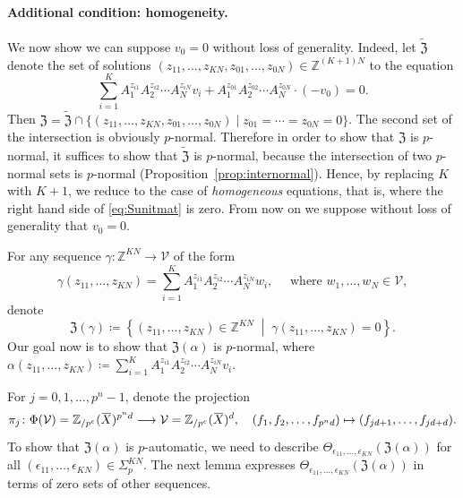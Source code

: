 \documentclass[letterpaper, 11pt, thm-restate]{article}
\numberwithin{equation}{section}
\newcommand{\Z}{\mathbb{Z}}
\newcommand{\Zpe}{\mathbb{Z}_{/p^e}}
\newcommand{\mV}{\mathcal{V}}
\newcommand{\mZ}{\mathfrak{Z}}
\newcommand{\oX}{\mkern 1.5mu\overline{\mkern-1.5mu X \mkern-1.5mu}\mkern 1.5mu}
\theoremstyle{definition}
\theoremstyle{definition}
\theoremstyle{definition}
\begin{document}
\paragraph{Additional condition: homogeneity.}
We now show we can suppose $v_0 = 0$ without loss of generality.
Indeed, let $\widetilde{\mZ}$ denote the set of solutions $(z_{11}, \ldots, z_{KN}, z_{01}, \ldots, z_{0N}) \in \Z^{(K+1)N}$ to the equation
\[
\sum_{i = 1}^K A_1^{z_{i1}} A_2^{z_{i2}} \cdots A_N^{z_{iN}} v_i + A_1^{z_{01}} A_2^{z_{02}} \cdots A_N^{z_{0N}} \cdot (-v_0) = 0.
\]
Then $\mZ = \widetilde{\mZ} \cap \{(z_{11}, \ldots, z_{KN}, z_{01}, \ldots, z_{0N}) \mid z_{01} = \cdots = z_{0N} = 0\}$.
The second set of the intersection is obviously $p$-normal.
Therefore in order to show that $\mZ$ is $p$-normal, it suffices to show that $\widetilde{\mZ}$ is $p$-normal, because the intersection of two $p$-normal sets is $p$-normal (Proposition~\ref{prop:internormal}).
Hence, by replacing $K$ with $K+1$, we reduce to the case of \emph{homogeneous} equations, that is, where the right hand side of \eqref{eq:Sunitmat} is zero.
From now on we suppose without loss of generality that $v_0 = 0$.

\bigskip

For any sequence $\gamma \colon \Z^{KN} \rightarrow \mV$ of the form
\begin{equation}\label{eq:formgamma}
\gamma(z_{11}, \ldots, z_{KN}) = \sum_{i = 1}^K A_1^{z_{i1}} A_2^{z_{i2}} \cdots A_N^{z_{iN}} w_i, \quad \text{ where } w_1, \ldots, w_N \in \mV,
\end{equation}
denote
\[
\mZ(\gamma) \coloneqq \left\{(z_{11}, \ldots, z_{KN}) \in \Z^{KN} \;\middle|\; \gamma(z_{11}, \ldots, z_{KN}) = 0 \right\}.
\]
Our goal now is to show that $\mZ(\alpha)$ is $p$-normal, where $\alpha(z_{11}, \ldots, z_{KN}) \coloneqq \sum_{i = 1}^K A_1^{z_{i1}} A_2^{z_{i2}} \cdots A_N^{z_{iN}} v_i$.

For $j = 0, 1, \ldots, p^n-1$, denote the projection
\[
\pi_j \colon \Phi(\mV) = \Zpe(\oX)^{p^nd} \longrightarrow \mV = \Zpe(\oX)^d, \quad (f_1, f_2, \ldots, f_{p^nd}) \mapsto (f_{jd+1}, \ldots, f_{jd+d}).
\]
To show that $\mZ(\alpha)$ is $p$-automatic, we need to describe $\Theta_{\epsilon_{11}, \ldots, \epsilon_{KN}}(\mZ(\alpha))$ for all $(\epsilon_{11}, \ldots, \epsilon_{KN}) \in \Sigma_p^{KN}$.
The next lemma expresses $\Theta_{\epsilon_{11}, \ldots, \epsilon_{KN}}(\mZ(\alpha))$ in terms of zero sets of other sequences.
\end{document}
